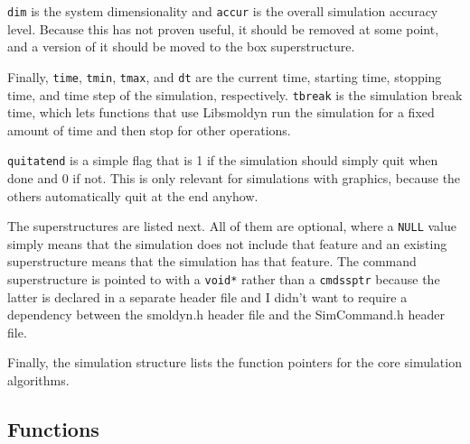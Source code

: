 \documentclass {scrbook}
\newcommand {\ttt} {\texttt}
\begin{document}
\ttt{dim} is the system dimensionality and \ttt{accur} is the overall simulation accuracy level. Because this has not proven useful, it should be removed at some point, and a version of it should be moved to the box superstructure.

Finally, \ttt{time}, \ttt{tmin}, \ttt{tmax}, and \ttt{dt} are the current time, starting time, stopping time, and time step of the simulation, respectively. \ttt{tbreak} is the simulation break time, which lets functions that use Libsmoldyn run the simulation for a fixed amount of time and then stop for other operations.

\ttt{quitatend} is a simple flag that is 1 if the simulation should simply quit when done and 0 if not. This is only relevant for simulations with graphics, because the others automatically quit at the end anyhow.

The superstructures are listed next. All of them are optional, where a \ttt{NULL} value simply means that the simulation does not include that feature and an existing superstructure means that the simulation has that feature. The command superstructure is pointed to with a \ttt{void*} rather than a \ttt{cmdssptr} because the latter is declared in a separate header file and I didn't want to require a dependency between the smoldyn.h header file and the SimCommand.h header file.

Finally, the simulation structure lists the function pointers for the core simulation algorithms.
\newline

\subsection{Functions}
\end{document}
